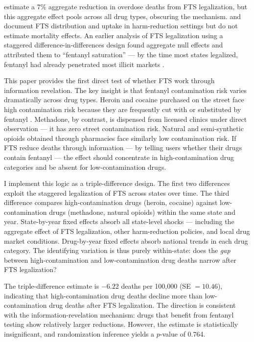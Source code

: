 \documentclass[12pt]{article}
\begin{document}
\citet{bhai2025} estimate a 7\% aggregate reduction in overdose deaths from FTS legalization, but this aggregate effect pools across all drug types, obscuring the mechanism. \citet{irvine2022} and \citet{goldman2023} document FTS distribution and uptake in harm-reduction settings but do not estimate mortality effects. An earlier analysis of FTS legalization using a staggered difference-in-differences design found aggregate null effects and attributed them to ``fentanyl saturation'' --- by the time most states legalized, fentanyl had already penetrated most illicit markets \citep{pardo2019, ciccarone2021}.

This paper provides the first direct test of whether FTS work through information revelation. The key insight is that fentanyl contamination risk varies dramatically across drug types. Heroin and cocaine purchased on the street face high contamination risk because they are frequently cut with or substituted by fentanyl \citep{nida2021}. Methadone, by contrast, is dispensed from licensed clinics under direct observation --- it has zero street contamination risk. Natural and semi-synthetic opioids obtained through pharmacies face similarly low contamination risk. If FTS reduce deaths through information --- by telling users whether their drugs contain fentanyl --- the effect should concentrate in high-contamination drug categories and be absent for low-contamination drugs.

I implement this logic as a triple-difference design. The first two differences exploit the staggered legalization of FTS across states over time. The third difference compares high-contamination drugs (heroin, cocaine) against low-contamination drugs (methadone, natural opioids) within the same state and year. State-by-year fixed effects absorb all state-level shocks --- including the aggregate effect of FTS legalization, other harm-reduction policies, and local drug market conditions. Drug-by-year fixed effects absorb national trends in each drug category. The identifying variation is thus purely within-state: does the \textit{gap} between high-contamination and low-contamination drug deaths narrow after FTS legalization?

The triple-difference estimate is $-6.22$ deaths per 100,000 (SE $= 10.46$), indicating that high-contamination drug deaths decline more than low-contamination drug deaths after FTS legalization. The direction is consistent with the information-revelation mechanism: drugs that benefit from fentanyl testing show relatively larger reductions. However, the estimate is statistically insignificant, and randomization inference yields a $p$-value of 0.764.
\end{document}
